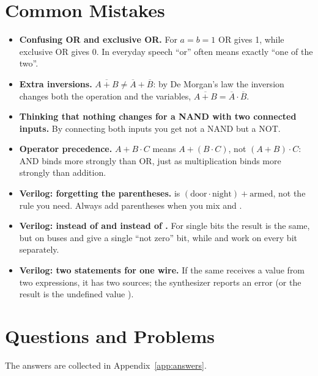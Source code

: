 \section{Common Mistakes}

\begin{warnbox}
\begin{itemize}
  \item \textbf{Confusing OR and exclusive OR.} For $a=b=1$ OR gives 1, while
    exclusive OR gives 0. In everyday speech ``or'' often means exactly
    ``one of the two''.
  \item \textbf{Extra inversions.} $\overline{A+B}\neq\overline{A}+\overline{B}$:
    by De Morgan's law the inversion changes both the operation and the variables,
    $\overline{A+B}=\overline{A}\cdot\overline{B}$.
  \item \textbf{Thinking that nothing changes for a NAND with two connected inputs.}
    By connecting both inputs you get not a NAND but a NOT.
  \item \textbf{Operator precedence.} $A+B\cdot C$ means $A+(B\cdot C)$, not
    $(A+B)\cdot C$: AND binds more strongly than OR, just as multiplication binds more strongly than addition.
  \item \textbf{Verilog: forgetting the parentheses.}  is $(\text{door}\cdot\text{night})+\text{armed}$, not the rule you
    need. Always add parentheses when you mix \code{\&} and \code{|}.
  \item \textbf{Verilog: \code{\&\&} instead of \code{\&} and \code{!} instead
    of \code{\textasciitilde}.} For single bits the result is the same, but on
    buses \code{\&\&} and \code{!} give a single ``not zero'' bit, while
    \code{\&} and \code{\textasciitilde} work on every bit separately.
  \item \textbf{Verilog: two  statements for one wire.} If the same
     receives a value from two expressions, it has two sources; the
    synthesizer reports an error (or the result is the undefined value
    ).
\end{itemize}
\end{warnbox}

\section{Questions and Problems}
\label{sec:tasks-gates}

The answers are collected in Appendix~\ref{app:answers}.

